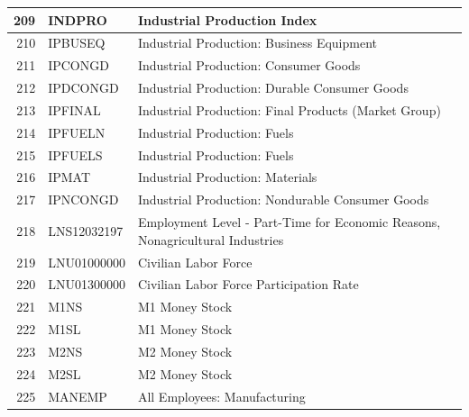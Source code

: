 \documentclass[11pt]{article}
\begin{document}
\begin{table}
\begin{tabular}{rp{5cm}p{11cm}}
  \hline
	209 & INDPRO & Industrial Production Index \\
  \hline
	210 & IPBUSEQ & Industrial Production: Business Equipment \\
  \hline
	211 & IPCONGD & Industrial Production: Consumer Goods \\
  \hline
	212 & IPDCONGD & Industrial Production: Durable Consumer Goods \\
  \hline
	213 & IPFINAL & Industrial Production: Final Products (Market Group) \\
  \hline
	214 & IPFUELN & Industrial Production: Fuels \\
  \hline
	215 & IPFUELS & Industrial Production: Fuels \\
  \hline
	216 & IPMAT & Industrial Production: Materials \\
  \hline
	217 &IPNCONGD & Industrial Production: Nondurable Consumer Goods \\
  \hline
	218 & LNS12032197 & Employment Level - Part-Time for Economic Reasons, Nonagricultural Industries \\
  \hline
	219 & LNU01000000 & Civilian Labor Force \\
  \hline
	220 & LNU01300000 & Civilian Labor Force Participation Rate \\
  \hline
	221 & M1NS & M1 Money Stock \\
  \hline
	222 & M1SL & M1 Money Stock \\
  \hline
	223 & M2NS & M2 Money Stock \\
  \hline
	224 & M2SL & M2 Money Stock \\
  \hline
	225 & MANEMP & All Employees: Manufacturing \\
\end{tabular}
\end{table}
\end{document}
